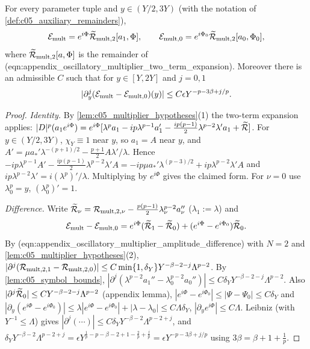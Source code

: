\begin{lemma}
  \label{lem:c05_multiplier_fundamental}
  For every parameter tuple and $y\in(Y/2,3Y)$ (with the notation of \cref{def:c05_auxiliary_remainders}),
  \begin{equation}\label{eqn:approx_E5_multiplier_expansions}
    \mathcal{E}_{\textup{mult}}=e^{i\Phi}\widetilde{\mathcal{R}}_{\textup{mult},2}[a_1,\Phi],\qquad
    \mathcal{E}_{\textup{mult},0}=e^{i\Phi_0}\widetilde{\mathcal{R}}_{\textup{mult},2}[a_0,\Phi_0],
  \end{equation}
  where $\widetilde{\mathcal{R}}_{\textup{mult},2}[a,\Phi]$ is the remainder of
  (eqn:appendix\_oscillatory\_multiplier\_two\_term\_expansion). Moreover there is an admissible $C$ such that for $y\in[Y,2Y]$ and $j=0,1$
  \begin{equation}\label{eqn:approx_E5_multiplier_difference_bound}
    |\partial_y^j(\mathcal{E}_{\textup{mult}}-\mathcal{E}_{\textup{mult},0})(y)|\le C\epsilon Y^{-p-3\beta+j/p}.
  \end{equation}
\end{lemma}
\begin{proof}
  \emph{Identity.} By \cref{lem:c05_multiplier_hypotheses}(1) the two-term expansion applies:
  $|D|^p(a_1e^{i\Phi})=e^{i\Phi}[\lambda^pa_1-ip\lambda^{p-1}a_1'-\frac{ip(p-1)}2\lambda^{p-2}\lambda'a_1+\widetilde{\mathcal{R}}]$.
  For $y\in(Y/2,3Y)$, $\chi_Y\equiv1$ near $y$, so $a_1=A$ near $y$, and $A'=\mu a_*'\lambda^{-(p+1)/2}-\frac{p+1}2A\lambda'/\lambda$. Hence
  $-ip\lambda^{p-1}A'-\frac{ip(p-1)}2\lambda^{p-2}\lambda'A=-ip\mu a_*'\lambda^{(p-3)/2}+ip\lambda^{p-2}\lambda'A$
  and $ip\lambda^{p-2}\lambda'=i(\lambda^p)'/\lambda$. Multiplying by $e^{i\Phi}$ gives the claimed form. For $\nu=0$ use
  $\lambda_0^p=y$, $(\lambda_0^p)'=1$.

  \emph{Difference.} Write $\widetilde{\mathcal{R}}_\nu=\mathcal{R}_{\textup{mult},2,\nu}-\frac{p(p-1)}2\lambda_\nu^{p-2}a_\nu''$ ($\lambda_1:=\lambda$) and
  \[
    \mathcal{E}_{\textup{mult}}-\mathcal{E}_{\textup{mult},0}=e^{i\Phi}(\widetilde{\mathcal{R}}_1-\widetilde{\mathcal{R}}_0)+(e^{i\Phi}-e^{i\Phi_0})\widetilde{\mathcal{R}}_0 .
  \]
  By (eqn:appendix\_oscillatory\_multiplier\_amplitude\_difference) with $N=2$ and \cref{lem:c05_multiplier_hypotheses}(2),
  $|\partial^j(\mathcal{R}_{\textup{mult},2,1}-\mathcal{R}_{\textup{mult},2,0})|\le C\min\{1,\delta_Y\}Y^{-\beta-2-j}\Lambda^{p-2}$.
  By \cref{lem:c05_symbol_bounds}, $|\partial^j(\lambda^{p-2}a_1''-\lambda_0^{p-2}a_0'')|\le C\delta_YY^{-\beta-2-j}\Lambda^{p-2}$.
  Also $|\partial^j\widetilde{\mathcal{R}}_0|\le CY^{-\beta-2-j}\Lambda^{p-2}$ (appendix lemma), $|e^{i\Phi}-e^{i\Phi_0}|\le|\Psi-\Psi_0|\le C\delta_Y$ and
  $|\partial_y(e^{i\Phi}-e^{i\Phi_0})|\le\lambda|e^{i\Phi}-e^{i\Phi_0}|+|\lambda-\lambda_0|\le C\Lambda\delta_Y$, $|\partial_ye^{i\Phi}|\le C\Lambda$.
  Leibniz (with $Y^{-1}\le\Lambda$) gives $|\partial^j(\cdots)|\le C\delta_YY^{-\beta-2}\Lambda^{p-2+j}$, and
  $\delta_YY^{-\beta-2}\Lambda^{p-2+j}=\epsilon Y^{\frac1p-p-\beta-2+1-\frac2p+\frac jp}=\epsilon Y^{-p-3\beta+j/p}$ using $3\beta=\beta+1+\frac1p$.
\end{proof}

